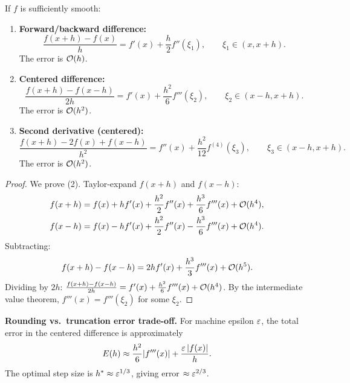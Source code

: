 \begin{theorem}
\label{thm:fd-errors}
If $f$ is sufficiently smooth:
\begin{enumerate}
    \item \textbf{Forward/backward difference:}
    \[
        \frac{f(x+h) - f(x)}{h} = f'(x) + \frac{h}{2}f''(\xi_1), \qquad \xi_1 \in (x, x+h).
    \]
    The error is $\mathcal{O}(h)$.

    \item \textbf{Centered difference:}
    \[
        \frac{f(x+h) - f(x-h)}{2h} = f'(x) + \frac{h^2}{6}f'''(\xi_2), \qquad \xi_2 \in (x-h, x+h).
    \]
    The error is $\mathcal{O}(h^2)$.

    \item \textbf{Second derivative (centered):}
    \[
        \frac{f(x+h) - 2f(x) + f(x-h)}{h^2} = f''(x) + \frac{h^2}{12}f^{(4)}(\xi_3), \qquad \xi_3 \in (x-h, x+h).
    \]
    The error is $\mathcal{O}(h^2)$.
\end{enumerate}
\end{theorem}

\begin{proof}
We prove (2). Taylor-expand $f(x+h)$ and $f(x-h)$:
\begin{align*}
    f(x+h) &= f(x) + hf'(x) + \frac{h^2}{2}f''(x) + \frac{h^3}{6}f'''(x) + \mathcal{O}(h^4), \\
    f(x-h) &= f(x) - hf'(x) + \frac{h^2}{2}f''(x) - \frac{h^3}{6}f'''(x) + \mathcal{O}(h^4).
\end{align*}
Subtracting:
\[
    f(x+h) - f(x-h) = 2hf'(x) + \frac{h^3}{3}f'''(x) + \mathcal{O}(h^5).
\]
Dividing by $2h$: $\frac{f(x+h)-f(x-h)}{2h} = f'(x) + \frac{h^2}{6}f'''(x) + \mathcal{O}(h^4)$. By the intermediate value theorem, $f'''(x) = f'''(\xi_2)$ for some $\xi_2$.
\end{proof}

\begin{warning}
\textbf{Rounding vs.\ truncation error trade-off.} For machine epsilon $\varepsilon$, the total error in the centered difference is approximately
\[
    E(h) \approx \frac{h^2}{6}|f'''(x)| + \frac{\varepsilon\,|f(x)|}{h}.
\]
The optimal step size is $h^* \approx \varepsilon^{1/3}$, giving error $\approx \varepsilon^{2/3}$.
\end{warning}

